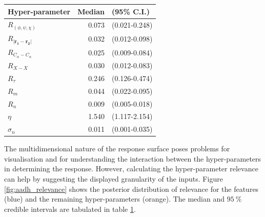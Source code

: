 \begin{table}
    \centering
    \begin{tabular}{|l|r|l|}
    \hline
                             Hyper-parameter &  Median &     (95\% C.I.) \\
    \hline\hline
                    $R_{(\phi, \psi, \chi)}$ &   0.073 &  (0.021-0.248) \\
     $R_{|\mathbf{r_{1}} - \mathbf{r_{2}}|}$ &   0.032 &  (0.012-0.098) \\
                 $R_{C_{\alpha}-C_{\alpha}}$ &   0.025 &  (0.009-0.084) \\
                                   $R_{X-X}$ &   0.030 &  (0.012-0.083) \\
                                  $R_{\tau}$ &   0.246 &  (0.126-0.474) \\
                                     $R_{m}$ &   0.044 &  (0.022-0.095) \\
                                     $R_{n}$ &   0.009 &  (0.005-0.018) \\
                                      $\eta$ &   1.540 &  (1.117-2.154) \\
                                  $\sigma_n$ &   0.011 &  (0.001-0.035) \\
    \hline
    \end{tabular}
    \label{tab:aadh_rel}
\end{table}

The multidimensional nature of the response surface poses problems for visualisation and for understanding the interaction between the hyper-parameters in determining the response. However, calculating the hyper-parameter relevance can help by suggesting the displayed granularity of the inputs. Figure \ref{fig:aadh_relevance} shows the posterior distribution of relevance for the features (blue) and the remaining hyper-parameters (orange). The median and $\SI{95}{\percent}$ credible intervals are tabulated in table \ref{tab:aadh_rel}. 

